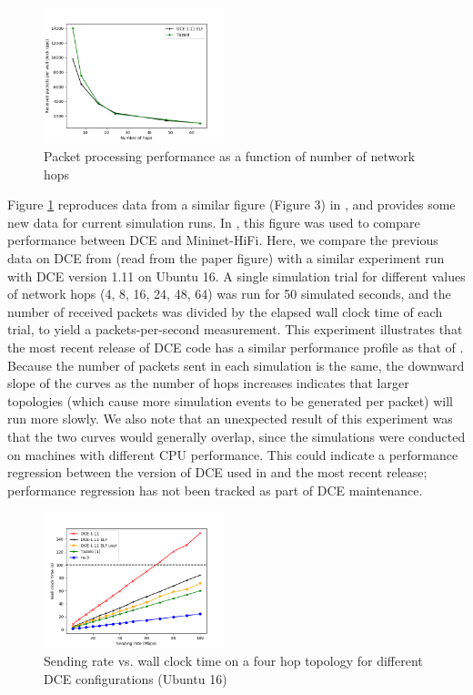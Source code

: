 \documentclass{sig-alternate}
\begin{document}
\begin{figure}[h!]
  \centering
    \includegraphics[width=0.47\textwidth]{figs/hops-vs-pps.png}
  \caption{Packet processing performance as a function of number of network hops}
  \label{fig:hops-vs-pps}
\end{figure}

Figure \ref{fig:hops-vs-pps} reproduces data from a similar figure (Figure 3)
in \cite{Tazaki13}, and provides some new data for current simulation runs.
In \cite{Tazaki13}, this figure was used to compare performance between
DCE and Mininet-HiFi.  Here, we compare the previous data on DCE from
\cite{Tazaki13} (read from the paper figure) with a similar experiment run
with DCE version 1.11 on Ubuntu 16.  A single simulation trial for different
values of network hops (4, 8, 16, 24, 48, 64) was run for 50 simulated
seconds, and the number of received packets was divided by the elapsed
wall clock time of each trial, to yield a packets-per-second measurement.
This experiment illustrates that the most recent release of DCE code has a
similar performance profile as that of \cite{Tazaki13}.  Because the
number of packets sent in each simulation is the same, the downward
slope of the curves as the number of hops increases indicates that larger
topologies (which cause more simulation events to be generated per packet)
will run more slowly.  We also note that an unexpected result of this
experiment was that the two curves would generally overlap, since the
simulations were conducted on machines with different CPU performance.
This could indicate a performance regression between the version of DCE
used in \cite{Tazaki13} and the most recent release; performance regression
has not been tracked as part of DCE maintenance.

\begin{figure}[h!]
  \centering
    \includegraphics[width=0.47\textwidth]{figs/rate-vs-time.png}
  \caption{Sending rate vs. wall clock time on a four hop topology for different DCE configurations (Ubuntu 16)}
  \label{fig:rate-vs-time}
\end{figure}
\end{document}
